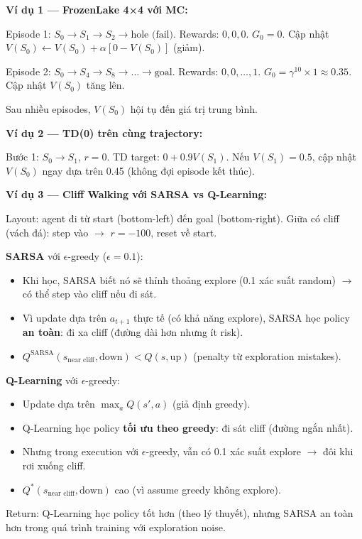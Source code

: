\documentclass[12pt,a4paper]{article}
\begin{document}
\textbf{Ví dụ 1 --- FrozenLake 4×4 với MC:}

Episode 1: $S_0 \to S_1 \to S_2 \to \text{hole (fail)}$. Rewards: $0, 0, 0$. $G_0 = 0$. Cập nhật $V(S_0) \leftarrow V(S_0) + \alpha[0 - V(S_0)]$ (giảm).

Episode 2: $S_0 \to S_4 \to S_8 \to \ldots \to \text{goal}$. Rewards: $0, 0, \ldots, 1$. $G_0 = \gamma^{10} \times 1 \approx 0.35$. Cập nhật $V(S_0)$ tăng lên.

Sau nhiều episodes, $V(S_0)$ hội tụ đến giá trị trung bình.

\textbf{Ví dụ 2 --- TD(0) trên cùng trajectory:}

Bước 1: $S_0 \to S_1$, $r=0$. TD target: $0 + 0.9 V(S_1)$. Nếu $V(S_1)=0.5$, cập nhật $V(S_0)$ ngay dựa trên 0.45 (không đợi episode kết thúc).

\textbf{Ví dụ 3 --- Cliff Walking với SARSA vs Q-Learning:}

Layout: agent đi từ start (bottom-left) đến goal (bottom-right). Giữa có cliff (vách đá): step vào $\to$ $r=-100$, reset về start.

\textbf{SARSA} với $\epsilon$-greedy ($\epsilon=0.1$):
\begin{itemize}[leftmargin=1.5em]
    \item Khi học, SARSA biết nó sẽ thỉnh thoảng explore (0.1 xác suất random) $\to$ có thể step vào cliff nếu đi sát.
    \item Vì update dựa trên $a_{t+1}$ thực tế (có khả năng explore), SARSA học policy \textbf{an toàn}: đi xa cliff (đường dài hơn nhưng ít risk).
    \item $Q^\text{SARSA}(s_{\text{near cliff}}, \text{down}) < Q(s, \text{up})$ (penalty từ exploration mistakes).
\end{itemize}

\textbf{Q-Learning} với $\epsilon$-greedy:
\begin{itemize}[leftmargin=1.5em]
    \item Update dựa trên $\max_a Q(s',a)$ (giả định greedy).
    \item Q-Learning học policy \textbf{tối ưu theo greedy}: đi sát cliff (đường ngắn nhất).
    \item Nhưng trong execution với $\epsilon$-greedy, vẫn có 0.1 xác suất explore $\to$ đôi khi rơi xuống cliff.
    \item $Q^*(s_{\text{near cliff}}, \text{down})$ cao (vì assume greedy không explore).
\end{itemize}

Return: Q-Learning học policy tốt hơn (theo lý thuyết), nhưng SARSA an toàn hơn trong quá trình training với exploration noise.
\end{document}
